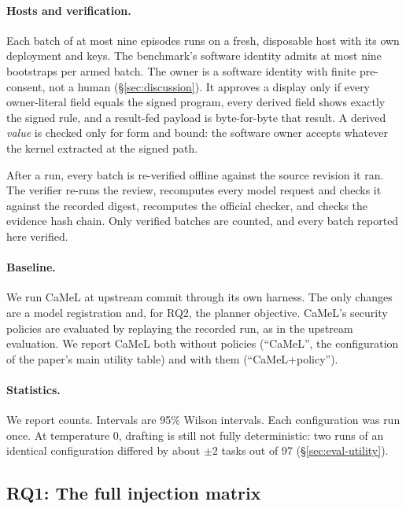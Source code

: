 \documentclass[letterpaper,twocolumn,10pt]{article}
\newcommand{\code}[1]{\texttt{\detokenize{#1}}}
\begin{document}
\paragraph{Hosts and verification.} Each batch of at most nine episodes
runs on a fresh, disposable host with its own deployment and keys. The
benchmark's software identity admits at most nine bootstraps per armed
batch. The owner is a software identity with finite pre-consent, not a
human (\S\ref{sec:discussion}). It approves a display only if every
owner-literal field equals the signed program, every derived field shows
exactly the signed rule, and a result-fed payload is byte-for-byte that
result. A derived \emph{value} is checked only for form and bound: the
software owner accepts whatever the kernel extracted at the signed path.

After a run, every batch is re-verified offline against the source
revision it ran. The verifier re-runs the review, recomputes every model
request and checks it against the recorded digest, recomputes the
official checker, and checks the evidence hash chain. Only verified
batches are counted, and every batch reported here verified.

\paragraph{Baseline.} We run CaMeL at upstream commit \code{f083b6b}
through its own harness. The only changes are a model registration and,
for RQ2, the planner objective. CaMeL's security policies are evaluated
by replaying the recorded run, as in the upstream evaluation. We report
CaMeL both without policies (``CaMeL'', the configuration of the paper's
main utility table) and with them (``CaMeL+policy'').

\paragraph{Statistics.} We report counts. Intervals are 95\% Wilson
intervals. Each configuration was run once. At temperature 0, drafting is
still not fully deterministic: two runs of an identical configuration
differed by about $\pm2$ tasks out of 97 (\S\ref{sec:eval-utility}).

\subsection{RQ1: The full injection matrix}
\label{sec:eval-injection}
\end{document}
